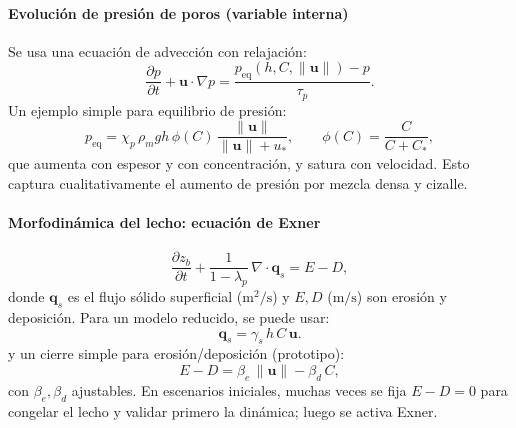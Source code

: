 \paragraph{Evolución de presión de poros (variable interna)}
\label{sec:presion_poros}
 
Se usa una ecuación de advección con relajación:
\begin{equation}
  \frac{\partial p}{\partial t} + \mathbf{u}\cdot\nabla p
  = \frac{p_{\mathrm{eq}}(h, C, \|\mathbf{u}\|) - p}{\tau_p}.
  \label{eq:presion}
\end{equation}
Un ejemplo simple para equilibrio de presión:
\begin{equation}
  p_{\mathrm{eq}} = \chi_p\, \rho_m g h\, \phi(C)\, \frac{\|\mathbf{u}\|}{\|\mathbf{u}\| + u_*},
  \qquad
  \phi(C) = \frac{C}{C + C_*},
  \label{eq:peq}
\end{equation}
que aumenta con espesor y con concentración, y satura con velocidad. Esto
captura cualitativamente el aumento de presión por mezcla densa y cizalle.
 
\paragraph{Morfodinámica del lecho: ecuación de Exner}
\label{sec:exner}
 
\begin{equation}
  \frac{\partial z_b}{\partial t} + \frac{1}{1 - \lambda_p}\,\nabla\cdot\mathbf{q}_s = E - D,
  \label{eq:exner}
\end{equation}
donde $\mathbf{q}_s$ es el flujo sólido superficial ($\mathrm{m^2/s}$) y $E, D$
($\mathrm{m/s}$) son erosión y deposición. Para un modelo reducido, se puede usar:
\begin{equation}
  \mathbf{q}_s = \gamma_s\, h\, C\, \mathbf{u}.
  \label{eq:qs}
\end{equation}
y un cierre simple para erosión/deposición (prototipo):
\begin{equation}
  E - D = \beta_e\, \|\mathbf{u}\| - \beta_d\, C,
  \label{eq:erosion_deposicion}
\end{equation}
con $\beta_e, \beta_d$ ajustables. En escenarios iniciales, muchas veces se fija
$E - D = 0$ para congelar el lecho y validar primero la dinámica; luego se activa
Exner.


